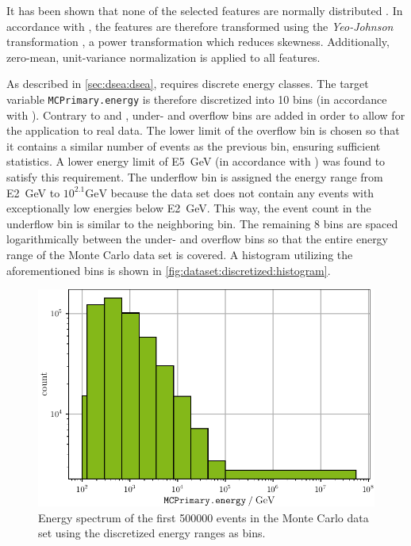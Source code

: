It has been shown that none of the selected features are normally distributed \cite{dsea_jan}.
In accordance with \cite{dsea_jan},
the features are therefore transformed using the \emph{Yeo-Johnson} transformation \cite{yeo_johnson},
a power transformation which reduces skewness.
%
Additionally, zero-mean, unit-variance normalization is applied to all features.


As described in \autoref{sec:dsea:dsea}, \dsea{} requires discrete energy classes.
The target variable \texttt{MCPrimary.energy} is therefore discretized into \num{10} bins
(in accordance with \cite{dsea_samuel}).
%
Contrary to \cite{dsea_jan} and \cite{dsea_samuel},
under- and overflow bins are added
  in order to allow for the application to real data.
%
The lower limit of the overflow bin is chosen so that it contains a similar number of events as the previous bin,
ensuring sufficient statistics.
A lower energy limit of \SI{E5}{\giga\electronvolt} (in accordance with \cite{dsea_samuel}) was found to satisfy this requirement.
%
The underflow bin is assigned the energy range from \SI{E2}{\giga\electronvolt} to $10^{2.1} \si{\giga\electronvolt}$
  because the data set does not contain any events with exceptionally low energies below \SI{E2}{\giga\electronvolt}.
This way, the event count in the underflow bin is similar to the neighboring bin.
%
The remaining \num{8} bins are spaced logarithmically between the under- and overflow bins
  so that the entire energy range of the Monte Carlo data set is covered.
%
A histogram utilizing the aforementioned bins is shown in \autoref{fig:dataset:discretized:histogram}.

\begin{figure}
  \centering
  \includegraphics[scale=0.9]{content/plots/dataset_500k:discretized:histogram_full.pdf}
  \caption{
    Energy spectrum of the first \num{500000} events
    in the Monte Carlo data set
    using the discretized energy ranges as bins.
  }
  \label{fig:dataset:discretized:histogram}
\end{figure}


